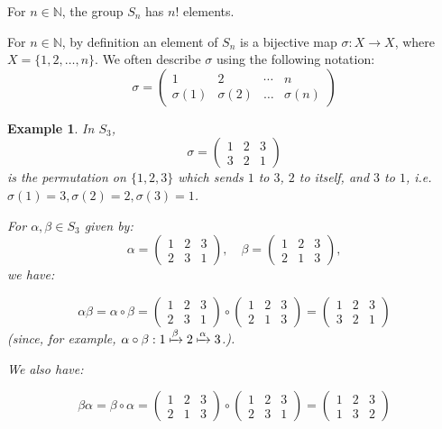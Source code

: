 \documentclass[a4paper,12pt]{report}
\newcommand{\ra}{\longrightarrow}
\newcounter{statement}
\numberwithin{statement}{chapter}
\newtheorem{eg}[statement]{\bf Example}
\numberwithin{equation}{chapter}
\numberwithin{section}{chapter}
\numberwithin{subsection}{section}
\begin{document}
For $n \in \mathbb{N}$, the group $S_n$ has $n!$ elements.



For $n \in \mathbb{N}$,
by definition an element of $S_n$ is a bijective map $\sigma : X \ra X$,
where $X = \{1, 2, \ldots, n\}$.
We often describe $\sigma$ using the following notation:
\[
\sigma = \left(\begin{matrix}
1 & 2 & \cdots & n\\
\sigma(1) & \sigma(2) & \ldots & \sigma(n)
\end{matrix}
\right)
\]

\begin{eg}
In $S_3$,
\[
\sigma = \left(
\begin{matrix}
1 & 2 & 3\\
3 & 2 & 1
\end{matrix}
\right)
\]
is the permutation on $\{1, 2, 3\}$
which sends $1$ to $3$, $2$ to itself, and $3$ to $1$,
i.e. $\sigma(1) = 3, \sigma(2) = 2, \sigma(3) = 1$.




For $\alpha, \beta \in S_3$ given by:
\[
\alpha =
\left(
\begin{matrix}
1 & 2 & 3\\
2 & 3 & 1
\end{matrix}\right),
\quad
\beta =
\left(\begin{matrix}
1 & 2 & 3\\
2 & 1 & 3
\end{matrix}\right),
\]
we have:




\[
\alpha\beta = \alpha\circ\beta
=
\left(\begin{matrix}
1 & 2 & 3\\
2 & 3 & 1
\end{matrix}\right) \circ
\left(\begin{matrix}
1 & 2 & 3\\
2 & 1 & 3
\end{matrix}\right)
=\left(\begin{matrix}
1 & 2 & 3\\
3 & 2 & 1
\end{matrix}\right)
\]
(since, for example, $\alpha\circ\beta: 1 \xmapsto{\beta} 2 \xmapsto{\alpha} 3$.).



We also have:




\[
\beta\alpha = \beta\circ\alpha
= \left(\begin{matrix}
1 & 2 & 3\\
2 & 1 & 3
\end{matrix}\right) \circ
\left(\begin{matrix}
1 & 2 & 3\\
2 & 3 & 1
\end{matrix}\right)
=
\left(\begin{matrix}
1 & 2 & 3\\
1 & 3 & 2
\end{matrix}\right)
\]


\end{eg}
\end{document}

